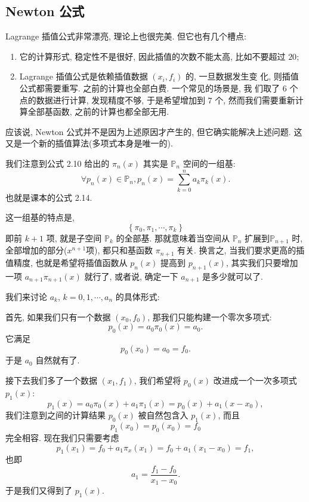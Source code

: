 \documentclass[a4paper]{ctexart}
\newcommand{\remark}[1]
{\noindent {\bf Remark {#1}}}
\begin{document}

\subsection{Newton 公式}

\remark{2.8} Lagrange 插值公式非常漂亮, 理论上也很完美. 但它也有几个槽点:

\begin{enumerate}
\item 它的计算形式, 稳定性不是很好, 因此插值的次数不能太高, 比如不要超过 $20$;
\item Lagrange 插值公式是依赖插值数据 $(x_i, f_i)$ 的, 一旦数据发生变
  化, 则插值公式都需要重写. 之前的计算也全部白费. 一个常见的场景是, 我
  们取了 $6$ 个点的数据进行计算, 发现精度不够, 于是希望增加到 $7$ 个,
  然而我们需要重新计算全部基函数, 之前的计算也都全部无用. 
\end{enumerate}

应该说, Newton 公式并不是因为上述原因才产生的, 但它确实能解决上述问题.
这又是一个新的插值算法(多项式本身是唯一的).

我们注意到公式 2.10 给出的 $\pi_n(x)$ 其实是 $\mathbb{P}_n$ 空间的一组基: 
$$
\forall p_n(x) \in \mathbb{P}_n, p_n(x) = \sum_{k = 0}^n a_k \pi_k(x).
$$
也就是课本的公式 2.14.

这一组基的特点是,
$$
\left\{\pi_0, \pi_1, \cdots, \pi_k\right\}
$$
即前 $k + 1$ 项, 就是子空间 $\mathbb{P}_k$ 的全部基. 那就意味着当空间从
$\mathbb{P}_n$ 扩展到$\mathbb{P}_{n + 1}$ 时, 全部增加的部分($x^{n + 1}项$),
都只和基函数 $\pi_{n + 1}$ 有关. 换言之, 当我们要求更高的插值精度, 也就是希望将插值函数从
$p_n(x)$ 提高到 $p_{n + 1}(x)$, 其实我们只要增加一项
$a_{n + 1}\pi_{n + 1}(x)$ 就行了, 或者说, 确定一下 $a_{n + 1}$ 是多少就可以了.

我们来讨论 $a_k$, $k = 0, 1, \cdots, a_n$
的具体形式:

首先, 如果我们只有一个数据 $(x_0, f_0)$, 那我们只能构建一个零次多项式:
$$
p_0(x) = a_0 \pi_0(x) = a_0. 
$$
它满足
$$
p_0(x_0) = a_0 = f_0.
$$
于是 $a_0$ 自然就有了.

接下去我们多了一个数据 $(x_1, f_1)$, 我们希望将 $p_0(x)$ 改进成一个一次多项式 $p_1(x)$:
$$
p_1(x) = a_0 \pi_0(x) + a_1 \pi_1(x) = p_0(x) + a_1 (x - x_0),
$$
我们注意到之间的计算结果 $p_0(x)$ 被自然包含入 $p_1(x)$, 而且
$$
p_1(x_0) = p_0(x_0) = f_0
$$
完全相容. 现在我们只需要考虑
$$
p_1(x_1) = f_0 + a_1 \pi_x(x_1) = f_0 + a_1 (x_1 - x_0) = f_1,
$$
也即
$$
a_1 = \frac{f_1 - f_0}{x_1 - x_0}.
$$
于是我们又得到了 $p_1(x)$.
\end{document}
